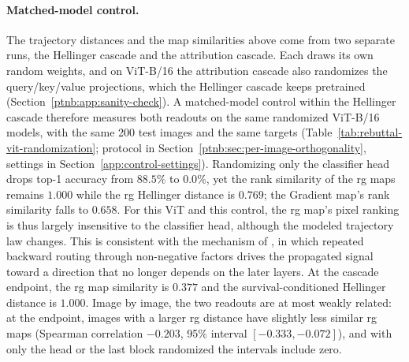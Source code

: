 \paragraph{Matched-model control.}
The trajectory distances and the map similarities above come from two separate runs, the Hellinger cascade and the attribution cascade. Each draws its own random weights, and on ViT-B/16 the attribution cascade also randomizes the query/key/value projections, which the Hellinger cascade keeps pretrained (Section~\ref{ptnb:app:sanity-check}). A matched-model control within the Hellinger cascade therefore measures both readouts on the same randomized ViT-B/16 models, with the same 200 test images and the same targets (Table~\ref{tab:rebuttal-vit-randomization}; protocol in Section~\ref{ptnb:sec:per-image-orthogonality}, settings in Section~\ref{app:control-settings}). Randomizing only the classifier head drops top-1 accuracy from $88.5\%$ to $0.0\%$, yet the rank similarity of the \ac{rg} maps remains $1.000$ while the \ac{rg} Hellinger distance is $0.769$; the Gradient map's rank similarity falls to $0.658$. For this ViT and this control, the \ac{rg} map's pixel ranking is thus largely insensitive to the classifier head, although the modeled trajectory law changes. This is consistent with the mechanism of \textcite{sixt2020whenexplanationslie}, in which repeated backward routing through non-negative factors drives the propagated signal toward a direction that no longer depends on the later layers. At the cascade endpoint, the \ac{rg} map similarity is $0.377$ and the survival-conditioned Hellinger distance is $1.000$. Image by image, the two readouts are at most weakly related: at the endpoint, images with a larger \ac{rg} distance have slightly less similar \ac{rg} maps (Spearman correlation $-0.203$, 95\% interval $[-0.333,-0.072]$), and with only the head or the last block randomized the intervals include zero.

\begin{table}[htbp]
\TableContent{
\centering\small

}%
\caption[Matched-model control on ViT-B/16]{Matched-model control on ViT-B/16: trajectory distances and map similarities measured on the same randomized models ($n=200$ test images; dataset label as target; query/key/value projections pretrained throughout). The columns give the randomized part of the model: the classifier head, the cascade through the last encoder block, and the whole cascade. The pretrained model has top-1 accuracy $88.5\%$ and mean target probability $0.736$ on these images. Distances and map similarities are means $\pm$ standard deviations over the images; $\rho(|a|)$ is the Spearman correlation of the absolute attribution maps of the pretrained and the randomized model. The last row is the Spearman correlation across images between the \ac{rg} distance and the \ac{rg} map similarity, with 95\% bootstrap intervals; it is exploratory and unadjusted.}
\label{tab:rebuttal-vit-randomization}
\end{table}

